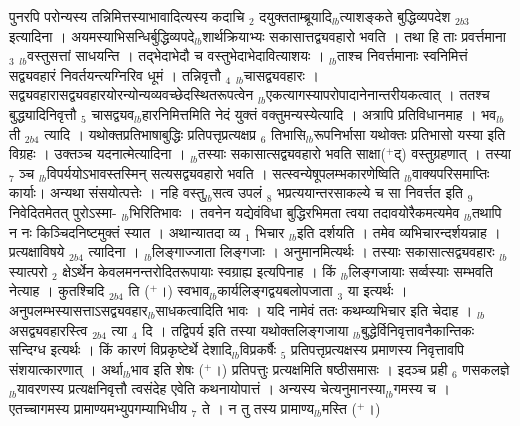 \documentclass[article,12pt,a4paper]{memoir}%
\newcommand{\add}[1]{($^{+}$#1)}
\begin{document}
	  
	  \pstart \leavevmode%
	पुनरपि परोन्यस्य तन्निमित्तस्याभावादित्यस्य कदाचि {\tiny $_{2}$} दयुक्तताम्ब्रूयादि{\tiny $_{lb}$}त्याशङ्कते {\color{DodgerBlue3}बुद्धिव्यपदेश} {\tiny $_{2b3}$} इत्यादिना । अयमस्याभिसन्धिर्बुद्धिव्यपदे{\tiny $_{lb}$}शार्थक्रियाभ्यः सकासात्तद्व्यवहारो भवति । तथा हि ताः प्रवर्त्तमाना {\tiny $_{3}$} {\tiny $_{lb}$}वस्तुसत्तां साधयन्ति । तद्भेदाभेदौ च वस्तुभेदाभेदावित्याशयः । {\tiny $_{lb}$}ताश्च निवर्त्तमानाः स्वनिमित्तं सद्व्यवहारं निवर्तयन्त्यग्निरिव धूमं । तन्निवृत्तौ {\tiny $_{4}$} {\tiny $_{lb}$}चासद्व्यवहारः । सद्व्यवहारासद्व्यवहारयोरन्योन्यव्यवच्छेदस्थितरूपत्वेन {\tiny $_{lb}$}एकत्यागस्यापरोपादानेनान्तरीयकत्वात् । ततश्च बुद्ध्यादिनिवृत्तौ {\tiny $_{5}$} चासद्व्यव{\tiny $_{lb}$}हारनिमित्तमिति नेदं युक्तं वक्तुमन्यस्येत्यादि । अत्रापि प्रतिविधानमाह । {\color{DodgerBlue3}भव}{\tiny $_{lb}$} \leavevmode{} ती {\tiny $_{2b4}$} त्यादि । यथोक्तप्रतिभाषाबुद्धिः प्रतिपत्तृप्रत्यक्षप्र {\tiny $_{6}$} तिभासि{\tiny $_{lb}$}रूपनिर्भासा यथोक्तः प्रतिभासो यस्या इति विग्रहः । उक्तञ्च यदनात्मेत्यादिना । {\tiny $_{lb}$}तस्याः सकासात्सद्व्यवहारो भवति साक्षा\add{द्} वस्तुग्रहणात् । तस्या {\tiny $_{7}$} ञ्च {\tiny $_{lb}$}विपर्ययोऽभावस्तस्मिन् सत्यसद्व्यवहारो भवति । सत्स्वन्येषूपलम्भकारणेष्विति {\tiny $_{lb}$}वाक्यपरिसमाप्तिः कार्याः। अन्यथा संसयोत्पत्तेः । नहि वस्तु{\tiny $_{lb}$}सत्व उपलं {\tiny $_{8}$} भप्रत्ययान्तरसाकल्ये च सा निवर्त्तत इति {\tiny $_{9}$} \leavevmode{} निवेदितमेतत् पुरोऽस्मा- {\tiny $_{lb}$}भिरितिभावः । तवनेन यद्येवंविधा बुद्धिरभिमता त्वया तदावयोरैकमत्यमेव {\tiny $_{lb}$}तथापि न नः किञ्चिदनिष्टमुक्तं स्यात । अथान्यातदा व्य {\tiny $_{1}$} भिचार {\tiny $_{lb}$}इति दर्शयति । तमेव व्यभिचारन्दर्शयन्नाह । {\color{DodgerBlue3}प्रत्यक्षाविषये} {\tiny $_{2b4}$} त्यादिना । {\tiny $_{lb}$}लिङ्गाज्जाता लिङ्गजाः । अनुमानमित्यर्थः । तस्याः सकासात्सद्व्यवहारः {\tiny $_{lb}$}स्यात्परो {\tiny $_{2}$} क्षेऽर्थेन केवलमनन्तरोदितरूपायाः स्वग्राह्य इत्यपिनाह । किं {\tiny $_{lb}$}लिङ्गजायाः सर्व्वस्याः सम्भवति नेत्याह । {\color{DodgerBlue3}कुतश्चिदि} {\tiny $_{2b4}$} ति \add{।} स्वभाव{\tiny $_{lb}$}कार्यलिङ्गद्वयबलोपजाता {\tiny $_{3}$} या इत्यर्थः । अनुपलम्भस्यासत्ताऽसद्व्यवहार{\tiny $_{lb}$}साधकत्वादिति भावः । यदि नामेवं ततः कथम्व्यभिचार इति चेदाह । {\tiny $_{lb}$} {\color{DodgerBlue3}असद्व्यवहारस्त्वि} {\tiny $_{2b4}$} त्या {\tiny $_{4}$} दि । तद्विपर्य इति तस्या यथोक्तलिङ्गजाया {\tiny $_{lb}$}बुद्धेर्विनिवृत्तावनैकान्तिकः सन्दिग्ध इत्यर्थः । किं कारणं विप्रकृष्टेर्थे देशादि{\tiny $_{lb}$}विप्रकर्षैः {\tiny $_{5}$} प्रतिपत्तृप्रत्यक्षस्य प्रमाणस्य निवृत्तावपि संशयात्कारणात् । अर्था{\tiny $_{lb}$}भाव इति शेषः \add{।} प्रतिपत्तुः प्रत्यक्षमिति षष्ठीसमासः । इदञ्च प्रही {\tiny $_{6}$} णसकलज्ञे{\tiny $_{lb}$}यावरणस्य प्रत्यक्षनिवृत्तौ त्वसंदेह एवेति कथनायोपात्तं । अन्यस्य चेत्यनुमानस्या{\tiny $_{lb}$}गमस्य च । एतच्चागमस्य प्रामाण्यमभ्युपगम्याभिधीय {\tiny $_{7}$} ते । न तु तस्य प्रामाण्य{\tiny $_{lb}$}मस्ति \add{।}
\end{document}
